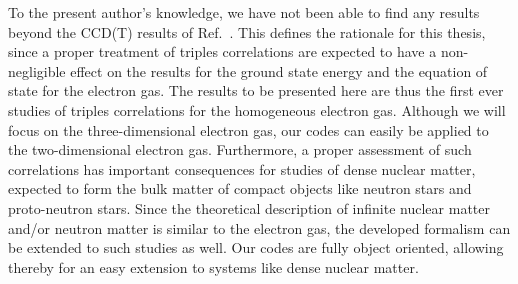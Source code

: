 To the present author's knowledge, we have not been able to find any
results beyond the CCD(T) results of Ref.~\cite{Shepherd2013}. This
defines the rationale for this thesis, since a proper treatment of
triples correlations are expected to have a non-negligible effect on
the results for the ground state energy and the equation of state for
the electron gas. The results to be presented here are thus the first
ever studies of triples correlations for the homogeneous electron
gas. Although we will focus on the three-dimensional electron gas, our
codes can easily be applied to the two-dimensional electron
gas. Furthermore, a proper assessment of such correlations has
important consequences for studies of dense nuclear matter, expected
to form the bulk matter of compact objects like neutron stars and
proto-neutron stars. Since the theoretical description of infinite
nuclear matter and/or neutron matter is similar to the electron gas,
the developed formalism can be extended to such studies as well. Our
codes are fully object oriented, allowing thereby for an easy
extension to systems like dense nuclear matter.

